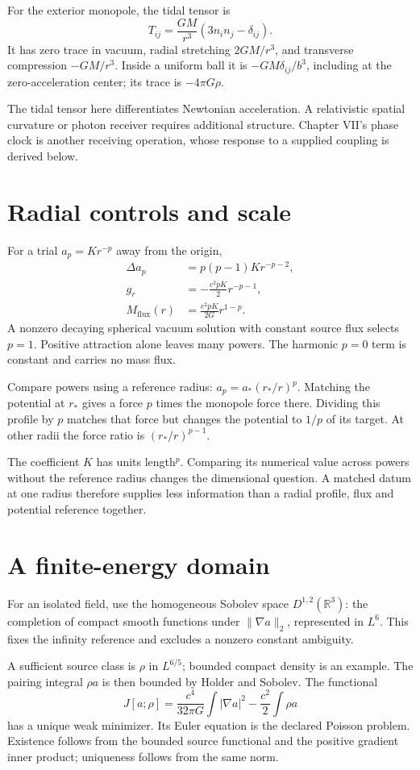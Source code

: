 \documentclass[10pt,twocolumn,letterpaper]{article}
\begin{document}
For the exterior monopole, the tidal tensor is
\[
T_{ij}=\frac{GM}{r^3}(3n_i n_j-\delta_{ij}).
\]
It has zero trace in vacuum, radial stretching $2GM/r^3$, and transverse compression $-GM/r^3$. Inside a uniform ball it is $-GM\delta_{ij}/b^3$, including at the zero-acceleration center; its trace is $-4\pi G\rho$.

The tidal tensor here differentiates Newtonian acceleration. A relativistic spatial curvature or photon receiver requires additional structure. Chapter VII's phase clock is another receiving operation, whose response to a supplied coupling is derived below.

\section{Radial controls and scale}
For a trial $a_p=Kr^{-p}$ away from the origin,
\[
\begin{aligned}
\Delta a_p&=p(p-1)Kr^{-p-2},\\
g_r&=-\frac{c^2pK}{2}r^{-p-1},\\
M_{\mathrm{flux}}(r)&=\frac{c^2pK}{2G}r^{1-p}.
\end{aligned}
\]
A nonzero decaying spherical vacuum solution with constant source flux selects $p=1$. Positive attraction alone leaves many powers. The harmonic $p=0$ term is constant and carries no mass flux.

Compare powers using a reference radius: $a_p=a_*(r_*/r)^p$. Matching the potential at $r_*$ gives a force $p$ times the monopole force there. Dividing this profile by $p$ matches that force but changes the potential to $1/p$ of its target. At other radii the force ratio is $(r_*/r)^{p-1}$.

The coefficient $K$ has units length$^p$. Comparing its numerical value across powers without the reference radius changes the dimensional question. A matched datum at one radius therefore supplies less information than a radial profile, flux and potential reference together.

\section{A finite-energy domain}
For an isolated field, use the homogeneous Sobolev space $D^{1,2}(\mathbb R^3)$: the completion of compact smooth functions under $\|\nabla a\|_2$, represented in $L^6$. This fixes the infinity reference and excludes a nonzero constant ambiguity.

A sufficient source class is $\rho$ in $L^{6/5}$; bounded compact density is an example. The pairing integral $\rho a$ is then bounded by Holder and Sobolev. The functional
\[
J[a;\rho]=\frac{c^4}{32\pi G}\int|\nabla a|^2-\frac{c^2}{2}\int\rho a
\]
has a unique weak minimizer. Its Euler equation is the declared Poisson problem. Existence follows from the bounded source functional and the positive gradient inner product; uniqueness follows from the same norm.
\end{document}

